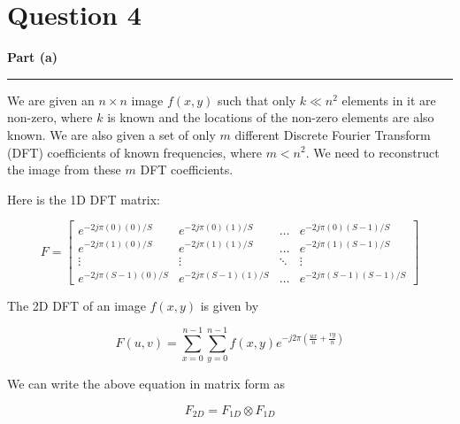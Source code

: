 \documentclass[a4paper,14pt]{article}
\title{\cooltitle{CS663 Assignment-5}}
\author{{\bf Saksham Rathi, Kavya Gupta, Shravan Srinivasa Raghavan} \\
\small Department of Computer Science, \\
Indian Institute of Technology Bombay \\}
\date{}
\newenvironment{solution}[2][]{%
    \begin{mdframed}[linecolor=blue!70!black, linewidth=2pt, roundcorner=10pt, backgroundcolor=yellow!10!white, skipabove=12pt, skipbelow=12pt]%
        \textbf{\large #2}
        \par\noindent\rule{\textwidth}{0.4pt}
}{
    \end{mdframed}
}
\begin{document}
\maketitle

\section*{Question 4}
\begin{solution}{Part (a)}
We are given an $n \times n$ image $f(x, y)$ such that only $k \ll n^2$ elements in it are non-zero, where $k$ is known and the locations of the non-zero elements are also known. We are also given a set of only $m$ different Discrete Fourier Transform (DFT) coefficients of known frequencies, where $m < n^2$. We need to reconstruct the image from these $m$ DFT coefficients.

Here is the 1D DFT matrix:

\[
    F = \begin{bmatrix}
        e^{-2j\pi(0)(0)/S} & e^{-2j\pi(0)(1)/S} & \ldots & e^{-2j\pi(0)(S-1)/S} \\
        e^{-2j\pi(1)(0)/S} & e^{-2j\pi(1)(1)/S}  & \ldots & e^{-2j\pi(1)(S-1)/S} \\
        \vdots & \vdots &  \ddots & \vdots \\
        e^{-2j\pi(S-1)(0)/S} & e^{-2j\pi(S-1)(1)/S} & \ldots & e^{-2j\pi(S - 1)(S - 1)/S}
    \end{bmatrix}
\]

The 2D DFT of an image $f(x, y)$ is given by

\begin{equation}
    F(u, v) = \sum_{x=0}^{n-1} \sum_{y=0}^{n-1} f(x, y) e^{-j2\pi \left(\frac{ux}{n} + \frac{vy}{n}\right)}
\end{equation}

We can write the above equation in matrix form as

\begin{equation}
    F_{2D} = F_{1D} \otimes F_{1D}
\end{equation}


\end{solution}
\end{document}
